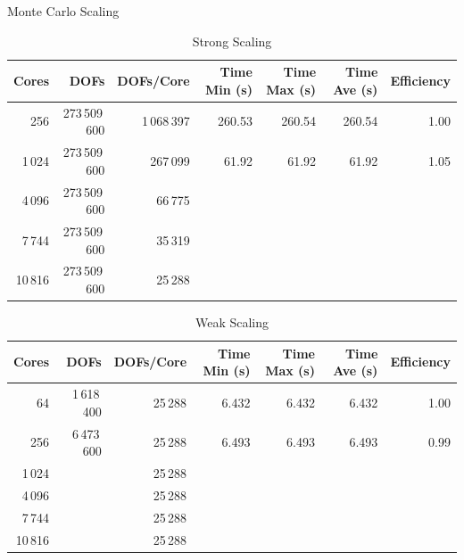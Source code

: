 \documentclass{beamer}
\begin{document}
\begin{frame}{Monte Carlo Scaling}

  \vspace{-0.1in}
  
  \begin{table}[htb!]
    \tiny
    \begin{center}
      \begin{tabular}{rrrrrrr}
        \toprule
        \multicolumn{1}{r}{Cores} &
        \multicolumn{1}{r}{DOFs} &
        \multicolumn{1}{r}{DOFs/Core} &
        \multicolumn{1}{r}{Time Min (s)} &
        \multicolumn{1}{r}{Time Max (s)} &
        \multicolumn{1}{r}{Time Ave (s)} &
        \multicolumn{1}{r}{Efficiency}
        \\ \midrule
        256 & 273\,509\,600 & 1\,068\,397 & 260.53 & 260.54 & 260.54 & 1.00 \\
        1\,024 & 273\,509\,600 & 267\,099 & 61.92 & 61.92 & 61.92 & 1.05 \\
        4\,096 & 273\,509\,600 & 66\,775 & & & & \\
        7\,744 & 273\,509\,600 & 35\,319 & & & & \\
        10\,816 & 273\,509\,600 & 25\,288 & & & & \\
        \bottomrule
      \end{tabular}
    \end{center}
    \vspace{-0.09in}
    \caption{\small Strong Scaling}
  \end{table} 

  \vspace{-0.2in}
  
  \begin{table}[htb!]
    \tiny
    \begin{center}
      \begin{tabular}{rrrrrrr}
        \toprule
        \multicolumn{1}{r}{Cores} &
        \multicolumn{1}{r}{DOFs} &
        \multicolumn{1}{r}{DOFs/Core} &
        \multicolumn{1}{r}{Time Min (s)} &
        \multicolumn{1}{r}{Time Max (s)} &
        \multicolumn{1}{r}{Time Ave (s)} &
        \multicolumn{1}{r}{Efficiency}
        \\ \midrule
        64 & 1\,618\,400 & 25\,288 & 6.432 & 6.432 & 6.432 & 1.00 \\
        256 & 6\,473\,600 & 25\,288 & 6.493 & 6.493 & 6.493 & 0.99 \\
        1\,024 & & 25\,288 & & & & \\
        4\,096 & & 25\,288 & & & & \\
        7\,744 & & 25\,288 & & & & \\
        10\,816 & & 25\,288 & & & & \\
        \bottomrule
      \end{tabular}
    \end{center}
    \vspace{-0.09in}
    \caption{\small Weak Scaling}
  \end{table}


\end{frame}
\end{document}

